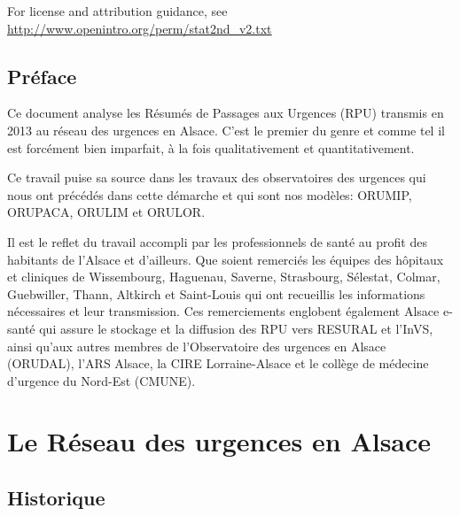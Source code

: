 \documentclass[12pt,english,french,twoside]{book}\usepackage[]{graphicx}\usepackage[]{color}
\begin{document}
\noindent For license and attribution guidance, see \url{http://www.openintro.org/perm/stat2nd_v2.txt}

\mainmatter

\tableofcontents
\listoftables
\listoffigures





\chapter*{Préface}


Ce document analyse les Résumés de Passages aux Urgences (RPU) transmis en 2013 au réseau des urgences en Alsace. C'est le premier du genre et comme tel il est forcément bien imparfait, à la fois qualitativement et quantitativement.

Ce travail puise sa source dans les travaux des observatoires des urgences qui nous ont précédés dans cette démarche et qui sont nos modèles: ORUMIP, ORUPACA, ORULIM et ORULOR.

Il est le reflet du travail accompli par les professionnels de santé au profit des habitants de l'Alsace et d'ailleurs. Que soient remerciés les équipes des hôpitaux et cliniques de Wissembourg, Haguenau, Saverne, Strasbourg, Sélestat, Colmar, Guebwiller, Thann, Altkirch et Saint-Louis qui ont recueillis les informations nécessaires et leur transmission. Ces remerciements englobent également Alsace e-santé qui assure le stockage et la diffusion des RPU vers RESURAL et l'InVS, ainsi qu'aux autres membres de l'Observatoire des urgences en Alsace (ORUDAL), l'ARS Alsace, la CIRE Lorraine-Alsace et le collège de médecine d'urgence du Nord-Est (CMUNE).



\part{Le Réseau des urgences en Alsace}

\chapter{Historique}
\end{document}
